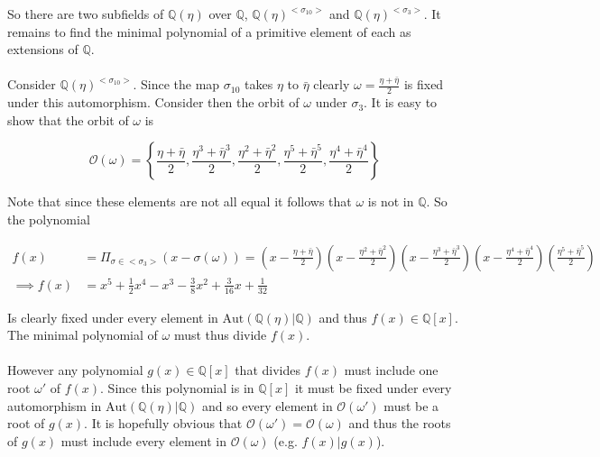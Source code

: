 \documentclass{article}
\begin{document}
So there are two subfields of $\mathbb{Q}(\eta)$ over $\mathbb{Q}$, $\mathbb{Q}(\eta)^{<\sigma_{10}>}$ 
and $\mathbb{Q}(\eta)^{<\sigma_3>}$. It remains to find the minimal polynomial of a primitive 
element of each as extensions of $\mathbb{Q}$. 

\paragraph{}
Consider $\mathbb{Q}(\eta)^{<\sigma_{10}>}$. Since the map $\sigma_{10}$ takes $\eta$ to $\bar{\eta}$ 
clearly $\omega = \frac{\eta + \bar{\eta}}{2}$ is fixed under this automorphism. Consider then the orbit of 
$\omega$ under $\sigma_3$. It is easy to show that the orbit of $\omega$ is 

\begin{equation*}
    \mathcal{O}(\omega) = \left\{\frac{\eta + \bar{\eta}}{2},\frac{\eta^3 + \bar{\eta}^3}{2},\frac{\eta^2 + \bar{\eta}^2}{2},\frac{\eta^5 + \bar{\eta}^5}{2},\frac{\eta^4 + \bar{\eta}^4}{2}\right\}
\end{equation*}

Note that since these elements are not all equal it follows that $\omega$ is not in $\mathbb{Q}$. So the polynomial 

\begin{align*}
    f(x) &= \Pi_{\sigma \in <\sigma_3>}(x - \sigma(\omega)) = \left(x - \frac{\eta + \bar{\eta}}{2}\right)\left(x - \frac{\eta^2 + \bar{\eta}^2}{2}\right)\left(x - \frac{\eta^3 + \bar{\eta}^3}{2}\right)\left(x - \frac{\eta^4 + \bar{\eta}^4}{2}\right)\left(\frac{\eta^5 + \bar{\eta}^5}{2}\right) \\
    \implies f(x) & = x^5+\frac{1}{2}x^4-x^3-\frac{3}{8}x^2+\frac{3}{16}x+ \frac{1}{32}
\end{align*}

Is clearly fixed under every element in $\text{Aut}(\mathbb{Q}(\eta)|\mathbb{Q})$ and thus $f(x) \in \mathbb{Q}[x]$. 
The minimal polynomial of $\omega$ must thus divide $f(x)$.

\paragraph{}
However any polynomial $g(x) \in \mathbb{Q}[x]$ that 
divides $f(x)$ must include one root $\omega'$ of $f(x)$. Since this polynomial is in $\mathbb{Q}[x]$ 
it must be fixed under every automorphism in $\text{Aut}(\mathbb{Q}(\eta)|\mathbb{Q})$ and so 
every element in $\mathcal{O}(\omega')$ must be a root of $g(x)$. It is hopefully obvious that $\mathcal{O}(\omega') = \mathcal{O}(\omega)$ 
and thus the roots of $g(x)$ must include every element in $\mathcal{O}(\omega)$ (e.g. $f(x)|g(x)$). 
\end{document}
